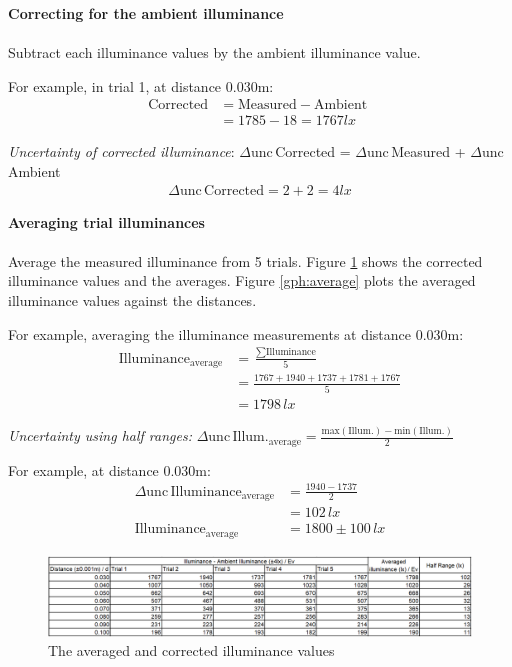 \documentclass[a4paper,12pt]{article}
\newcommand{\absun}{\Delta \text{unc}\,}
\newcommand{\paragraphnl}[1]{\textbf{#1}\\\\}
\begin{document}
\paragraphnl{Correcting for the ambient illuminance}
Subtract each illuminance values by the ambient illuminance value.

For example, in trial 1, at distance 0.030m:
\begin{align*}
    \text{Corrected} &= \text{Measured} - \text{Ambient }\\
    &= 1785 - 18 = 1767 \si{lx}
\end{align*}

\textit{Uncertainty of corrected illuminance}: $\absun$Corrected = $\absun$Measured + $\absun$Ambient
\begin{align*}
     \absun \text{Corrected} = 2 + 2 = 4\si{lx}
\end{align*}


\paragraphnl{Averaging trial illuminances}
Average the measured illuminance from 5 trials. Figure \ref{fig:average} shows the corrected illuminance values and the averages. Figure \ref{gph:average} plots the averaged illuminance values against the distances.

For example, averaging the illuminance measurements at distance 0.030m:
\begin{align*}
 \text{Illuminance}_{\text{average}} &= \frac{\sum \text{Illuminance}}{5}\\
 &= \frac{1767+1940+1737+1781+1767}{5}\\
 &= 1798\,\si{lx}
\end{align*}

\textit{Uncertainty using half ranges:} $\absun \text{Illum.}_{\text{average}} = \frac{\text{max}(\text{Illum}.) - \text{min}(\text{Illum}.)}{2}$

For example, at distance 0.030m:
\begin{align*}
 \absun \text{Illuminance}_{\text{average}} &= \frac{1940-1737}{2}\\
 &= 102 \,\si{lx}\\
 \text{Illuminance}_{\text{average}} &= 1800 \pm 100 \,\si{lx}
\end{align*}

\begin{figure}[H]
    \centering
    \includegraphics[width=\textwidth]{assets/averagedata.png}
    \caption{The averaged and corrected illuminance values}
    \label{fig:average}
\end{figure}
\end{document}
